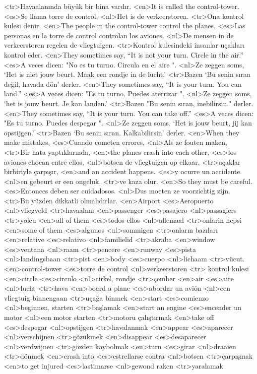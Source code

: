 <tr>Havaalanında büyük bir bina vardır.
<en>It is called the control-tower.
<es>Se llama torre de control.
<nl>Het is de verkeerstoren.
<tr>Ona kontrol kulesi denir.
<en>The people in the control-tower control the planes.
<es>Las personas en la torre de control controlan los aviones.
<nl>De mensen in de verkeerstoren regelen de vliegtuigen.
<tr>Kontrol kulesindeki insanlar uçakları kontrol eder.
<en>They sometimes say, “It is not your turn. Circle in the air.”
<es>A veces dicen: "No es tu turno. Circula en el aire ".
<nl>Ze zeggen soms, `Het is niet jouw beurt. Maak een rondje in de lucht.'
<tr>Bazen ‘Bu senin sıran değil, havada dön’ derler.
<en>They sometimes say, “It is your turn. You can land.”
<es>A veces dicen: "Es tu turno. Puedes aterrizar ".
<nl>Ze zeggen soms, `het is jouw beurt. Je kan landen.'
<tr>Bazen "Bu senin sıran, inebilirsin." derler.
<en>They sometimes say, “It is your turn. You can take off.”
<es>A veces dicen: "Es tu turno. Puedes despegar ".
<nl>Ze zeggen soms, `Het is jouw beurt, jij kan opstijgen.'
<tr>Bazen ‘Bu senin sıran. Kalkabilirsin’ derler.
<en>When they make mistakes,
<es>Cuando cometen errores,
<nl>Als ze fouten maken, 
<tr>Bir hata yaptıklarında,
<en>the planes crash into each other,
<es>los aviones chocan entre ellos,
<nl>botsen de vliegtuigen op elkaar,
<tr>uçaklar birbiriyle çarpışır,
<en>and an accident happens.
<es>y ocurre un accidente.
<nl>en gebeurt er een ongeluk.
<tr>ve kaza olur.
<en>So they must be careful.
<es>Entonces deben ser cuidadosos.
<nl>Dus moeten ze voorzichtig zijn.
<tr>Bu yüzden dikkatli olmalıdırlar.
<en>Airport
<es>Aeropuerto
<nl>vliegveld
<tr>havaalanı
<en>passenger
<es>pasajero
<nl>passagiers
<tr>yolcu
<en>all of them
<es>todos ellos
<nl>allemaal
<tr>onlarin hepsi
<en>some of them
<es>algunos
<nl>sommigen  
<tr>onların bazıları
<en>relative
<es>relativo
<nl>familielid  
<tr>akraba
<en>window
<es>ventana
<nl>raam  
<tr>pencere
<en>runway
<es>pista
<nl>landingsbaan  
<tr>pist
<en>body
<es>cuerpo
<nl>lichaam  
<tr>vücut.
<en>control-tower
<es>torre de control
<nl>verkeerstoren 
<tr> kontrol kulesi
<en>circle
<es>circulo
<nl>cirkel, rondje 
<tr>çember
<en>air
<es>aire
<nl>lucht 
<tr>hava
<en>board a plane
<es>abordar un avión
<nl>een vliegtuig binnengaan 
<tr>uçağa binmek
<en>start
<es>comienzo
<nl>beginnen, starten 
<tr>başlamak
<en>start an engine
<es>encender un motor
<nl>een motor starten 
<tr>motoru çalıştırmak
<en>take off
<es>despegar
<nl>opstijgen 
<tr>havalanmak
<en>appear
<es>aparecer
<nl>verschijnen 
<tr>gözükmek
<en>disappear
<es>desaparecer
<nl>verdwijnen 
<tr>gözden kaybolmak
<en>turn
<es>girar
<nl>draaien 
<tr>dönmek
<en>crash into
<es>estrellarse contra
<nl>botsen 
<tr>çarpışmak
<en>to get injured
<es>lastimarse
<nl>gewond raken 
<tr>yaralamak
